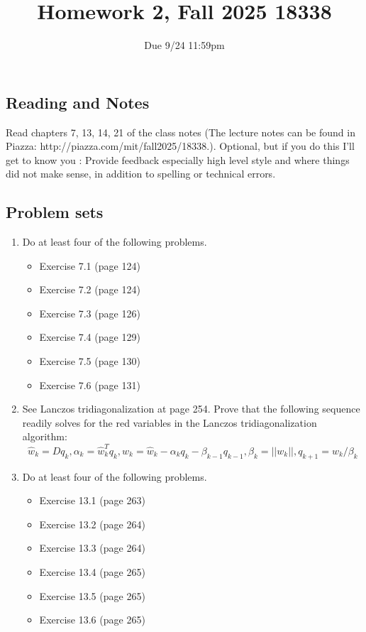 \documentclass{article}
\title{Homework 2, Fall 2025 18338}
\author{Due 9/24 11:59pm}
\date{}
\begin{document}
\maketitle


\subsection*{Reading and Notes}

Read chapters 7, 13, 14, 21 of the class notes
(The lecture notes  can be found in Piazza: http://piazza.com/mit/fall2025/18338.). 
Optional, but if you do this I'll get to know you : Provide  feedback especially high level style and where things did not make sense, in addition to spelling or technical errors.


\subsection*{Problem sets}
\begin{enumerate}
	\item Do at least four of the following problems. 
\begin{itemize}
\item Exercise 7.1 (page 124)
\item Exercise 7.2 (page 124)
\item Exercise 7.3 (page 126)
\item Exercise 7.4 (page 129)
\item Exercise 7.5 (page 130)
\item Exercise 7.6 (page 131)
\end{itemize}
\item See Lanczos tridiagonalization at page 254. Prove that the following sequence readily solves for the red variables in the Lanczos tridiagonalization algorithm:
\begin{equation*}
\hat{w}_k = Dq_k, \alpha_k = \hat{w}_k^T q_k, w_k = \hat{w}_k - \alpha_k q_k - \beta_{k-1}q_{k-1}, \beta_k = ||w_k||, q_{k+1} = w_k/\beta_k
\end{equation*}
\item Do at least four of the following problems. 

\begin{itemize}
\item Exercise 13.1 (page 263)
\item Exercise 13.2 (page 264)
\item Exercise 13.3 (page 264)
\item Exercise 13.4 (page 265)
\item Exercise 13.5 (page 265)
\item Exercise 13.6 (page 265)
\end{itemize}



\end{enumerate}
\end{document}
